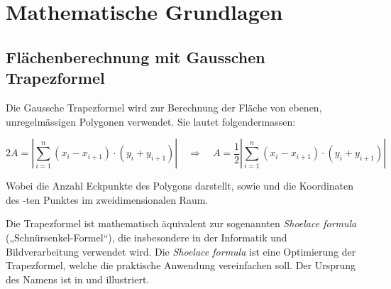 \section{Mathematische Grundlagen}
\blindtext

\subsection{Flächenberechnung mit Gausschen Trapezformel}
Die Gaussche Trapezformel wird zur Berechnung der Fläche  von ebenen, unregelmässigen Polygonen verwendet.
Sie lautet folgendermassen:

\[
2A = \left|\sum_{i=1}^{n} (x_i - x_{i+1}) \cdot (y_i + y_{i+1})\right|
\quad \Longrightarrow \quad
A = \frac{1}{2} \left|\sum_{i=1}^{n} (x_i - x_{i+1}) \cdot (y_i + y_{i+1})\right|
\]

Wobei  die Anzahl Eckpunkte des Polygons darstellt, sowie  und  die Koordinaten des -ten Punktes im zweidimensionalen Raum.

Die Trapezformel ist mathematisch äquivalent zur sogenannten \textit{Shoelace formula} („Schnürsenkel-Formel“), die insbesondere in der Informatik und Bildverarbeitung verwendet wird.
Die \textit{Shoelace formula} ist eine Optimierung der Trapezformel, welche die praktische Anwendung vereinfachen soll.
Der Ursprung des Namens ist in  und  illustriert\footnotemark.


